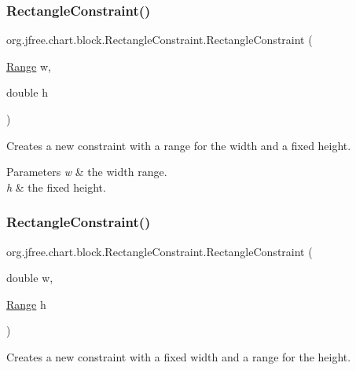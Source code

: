 \subsubsection{\texorpdfstring{Rectangle\+Constraint()}{RectangleConstraint()}\hspace{0.1cm}{\footnotesize\ttfamily [3/5]}}
{\footnotesize\ttfamily org.\+jfree.\+chart.\+block.\+Rectangle\+Constraint.\+Rectangle\+Constraint (\begin{DoxyParamCaption}\item[{\mbox{\hyperlink{classorg_1_1jfree_1_1data_1_1_range}{Range}}}]{w,  }\item[{double}]{h }\end{DoxyParamCaption})}

Creates a new constraint with a range for the width and a fixed height.


\begin{DoxyParams}{Parameters}
{\em w} & the width range. \\
\hline
{\em h} & the fixed height. \\
\hline
\end{DoxyParams}
\mbox{\label{classorg_1_1jfree_1_1chart_1_1block_1_1_rectangle_constraint_a329cc837a390b6f781ca0ce06fc82a70}} 
\subsubsection{\texorpdfstring{Rectangle\+Constraint()}{RectangleConstraint()}\hspace{0.1cm}{\footnotesize\ttfamily [4/5]}}
{\footnotesize\ttfamily org.\+jfree.\+chart.\+block.\+Rectangle\+Constraint.\+Rectangle\+Constraint (\begin{DoxyParamCaption}\item[{double}]{w,  }\item[{\mbox{\hyperlink{classorg_1_1jfree_1_1data_1_1_range}{Range}}}]{h }\end{DoxyParamCaption})}

Creates a new constraint with a fixed width and a range for the height.


